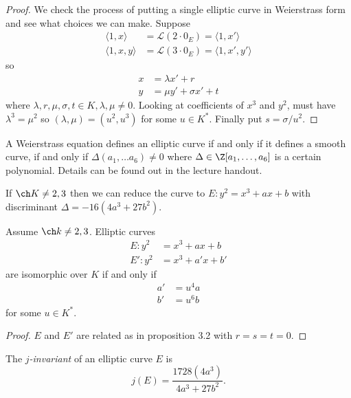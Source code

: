\documentclass[a4paper]{article}
\theoremstyle{definition}
\begin{document}
\begin{proof}
  We check the process of putting a single elliptic curve in Weierstrass form and see what choices we can make. Suppose
  \begin{align*}
    \langle 1, x \rangle &= \mathcal L(2 \cdot 0_E) = \langle 1, x' \rangle \\
    \langle 1, x, y \rangle &= \mathcal L(3 \cdot 0_E) = \langle 1, x', y' \rangle
  \end{align*}
  so
  \begin{align*}
    x &= \lambda x' + r \\
    y &= \mu y' + \sigma x' + t
  \end{align*}
  where \(\lambda, r, \mu, \sigma, t \in K, \lambda, \mu \neq 0\). Looking at coefficients of \(x^3\) and \(y^2\), must have \(\lambda^3 = \mu^2\) so \((\lambda, \mu) = (u^2, u^3)\) for some \(u \in K^*\). Finally put \(s = \sigma/u^2\).
\end{proof}

A Weierstrass equation defines an elliptic curve if and only if it defines a smooth curve, if and only if \(\Delta(a_1, \dots a_6) \neq 0\) where \(\Delta \in \Z[a_1, \dots, a_6]\) is a certain polynomial. Details can be found out in the lecture handout.

If \(\ch K \neq 2, 3\) then we can reduce the curve to \(E: y^2 = x^3 + ax + b\) with discriminant \(\Delta = -16(4a^3 + 27b^2)\).

\begin{corollary}
  Assume \(\ch k \neq 2, 3\). Elliptic curves
  \begin{align*}
    E: y^2 &= x^3 + ax + b \\
    E': y^2 &= x^3 + a'x + b'
  \end{align*}
  are isomorphic over \(K\) if and only if
  \begin{align*}
    a' &= u^4a \\
    b' &= u^6b
  \end{align*}
  for some \(u \in K^*\).
\end{corollary}

\begin{proof}
  \(E\) and \(E'\) are related as in proposition 3.2 with \(r = s = t = 0\).
\end{proof}

\begin{definition}[\(j\)-invariant]
  The \emph{\(j\)-invariant} of an elliptic curve \(E\) is
  \[
    j(E) = \frac{1728 (4a^3)}{4a^3 + 27b^2}.
  \]
\end{definition}
\end{document}
